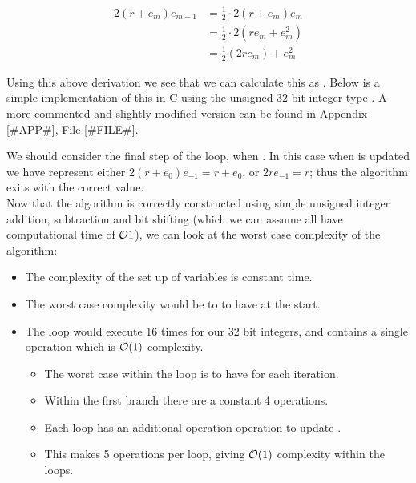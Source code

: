 \begin{displaymath}
\begin{align*}
	2(r+e_m)e_{m-1} 
		&= \frac{1}{2}\cdot 2(r+e_m)e_m\\
		&= \frac{1}{2}\cdot 2(re_m + e_m^2)\\
		&= \frac{1}{2}(2re_m) + e_m^2
\end{align*}
\end{displaymath}

Using this above derivation we see that we can calculate this as . Below is a simple implementation of this in C using the unsigned 32 bit integer type . A more commented and slightly modified version can be found in Appendix \ref{#APP#}, File \ref{#FILE#}.


We should consider the final step of the loop, when . In this case when  is updated we have  represent either \(2(r+e_0)e_{-1} = r + e_0\), or \(2re_{-1} = r\); thus the algorithm exits with the correct value.\\

Now that the algorithm is correctly constructed using simple unsigned integer addition, subtraction and bit shifting (which we can assume all have computational time of \(\mathcal{O}{1}\)), we can look at the worst case complexity of the algorithm:

\begin{itemize}
\item The complexity of the set up of variables is constant time.
\item The worst case complexity would be to to have  at the start.
\item The loop would execute 16 times for our 32 bit integers, and contains a single operation which is \(\mathcal{O}(1)\) complexity.
\begin{itemize}
	\item The worst case within the loop is to have  for each iteration.
	\item Within the first  branch there are a constant 4 operations.
	\item Each loop has an additional operation operation to update .
	\item This makes 5 operations per loop, giving \(\mathcal{O}(1)\) complexity within the loops.
\end{itemize}
\end{itemize}


